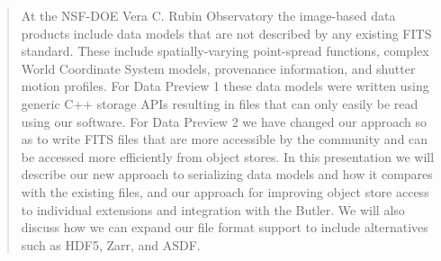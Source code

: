 
\begin{abstract}
At the NSF-DOE Vera C. Rubin Observatory the image-based data products include data models that are not described by any existing FITS standard. These include spatially-varying point-spread functions, complex World Coordinate System models, provenance information, and shutter motion profiles. For Data Preview 1 these data models were written using generic C++ storage APIs resulting in files that can only easily be read using our software. For Data Preview 2 we have changed our approach so as to write FITS files that are more accessible by the community and can be accessed more efficiently from object stores. In this presentation we will describe our new approach to serializing data models and how it compares with the existing files, and our approach for improving object store access to individual extensions and integration with the Butler. We will also discuss how we can expand our file format support to include alternatives such as HDF5, Zarr, and ASDF.
\end{abstract}
